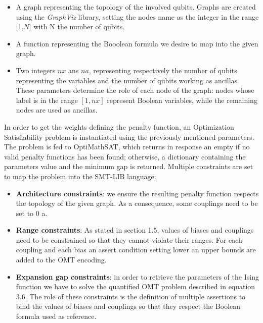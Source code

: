 \begin{itemize}
    \item A graph representing the topology of the involved qubits. Graphs are created using the \textit{GraphViz} library, setting the nodes name as the integer in the range [1,$N$] with N the number of qubits. 
    \item A function representing the Booolean formula we desire to map into the given graph.
    \item Two integers $nx$ ans $na$, representing respectively the number of qubits representing the variables and the number of qubits working as ancillas. These parameters determine the role of each node of the graph: nodes whose label is in the range $[1, nx]$ represent Boolean variables, while the remaining nodes are used as ancillas.
\end{itemize}

In order to get the weights defining the penalty function, an Optimization Satisfiability problem is instantiated using the previously mentioned parameters. The problem is fed to OptiMathSAT, which returns in response an empty if no valid penalty functions has been found; otherwise, a dictionary containing the parameters value and the minimum gap is returned. Multiple constraints are set to map the problem into the SMT-LIB language:
 
\begin{itemize}
    \item \textbf{Architecture constraints}: we ensure the resulting penalty function respects the topology of the given graph. As a consequence, some couplings need to be set to 0 a.
    \item \textbf{Range constraints}: As stated in section 1.5, values of biases and couplings need to be constrained so that they cannot violate their ranges. For each coupling and each bias an assert condition setting lower an upper bounds are added to the OMT encoding.
    \item \textbf{Expansion gap constraints}: in order to retrieve the parameters of the Ising function we have to solve the  quantified OMT problem described in equation 3.6. The role of these constraints is the definition of multiple assertions to bind the values of biases and couplings so that they respect the Boolean formula used as reference.
\end{itemize}

